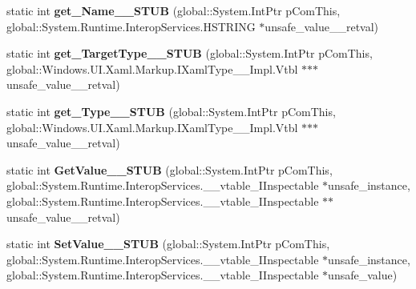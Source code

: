 \begin{DoxyCompactItemize}
\item 
\mbox{\label{struct_windows_1_1_u_i_1_1_xaml_1_1_markup_1_1_i_xaml_member_____impl_1_1_vtbl_a62fa2b1c4795a9faf836bcb5d053a965}} 
static int {\bfseries get\+\_\+\+Name\+\_\+\+\_\+\+S\+T\+UB} (global\+::\+System.\+Int\+Ptr p\+Com\+This, global\+::\+System.\+Runtime.\+Interop\+Services.\+H\+S\+T\+R\+I\+NG $\ast$unsafe\+\_\+value\+\_\+\+\_\+retval)
\item 
\mbox{\label{struct_windows_1_1_u_i_1_1_xaml_1_1_markup_1_1_i_xaml_member_____impl_1_1_vtbl_a5ca08627ab112151af93f8045a7e4d7f}} 
static int {\bfseries get\+\_\+\+Target\+Type\+\_\+\+\_\+\+S\+T\+UB} (global\+::\+System.\+Int\+Ptr p\+Com\+This, global\+::\+Windows.\+U\+I.\+Xaml.\+Markup.\+I\+Xaml\+Type\+\_\+\+\_\+\+Impl.\+Vtbl $\ast$$\ast$$\ast$unsafe\+\_\+value\+\_\+\+\_\+retval)
\item 
\mbox{\label{struct_windows_1_1_u_i_1_1_xaml_1_1_markup_1_1_i_xaml_member_____impl_1_1_vtbl_a1fe6ad1a5825b6a9bc1e12661eb240ac}} 
static int {\bfseries get\+\_\+\+Type\+\_\+\+\_\+\+S\+T\+UB} (global\+::\+System.\+Int\+Ptr p\+Com\+This, global\+::\+Windows.\+U\+I.\+Xaml.\+Markup.\+I\+Xaml\+Type\+\_\+\+\_\+\+Impl.\+Vtbl $\ast$$\ast$$\ast$unsafe\+\_\+value\+\_\+\+\_\+retval)
\item 
\mbox{\label{struct_windows_1_1_u_i_1_1_xaml_1_1_markup_1_1_i_xaml_member_____impl_1_1_vtbl_a701180ec993bf799ab85b05b4ac244e6}} 
static int {\bfseries Get\+Value\+\_\+\+\_\+\+S\+T\+UB} (global\+::\+System.\+Int\+Ptr p\+Com\+This, global\+::\+System.\+Runtime.\+Interop\+Services.\+\_\+\+\_\+vtable\+\_\+\+I\+Inspectable $\ast$unsafe\+\_\+instance, global\+::\+System.\+Runtime.\+Interop\+Services.\+\_\+\+\_\+vtable\+\_\+\+I\+Inspectable $\ast$$\ast$unsafe\+\_\+value\+\_\+\+\_\+retval)
\item 
\mbox{\label{struct_windows_1_1_u_i_1_1_xaml_1_1_markup_1_1_i_xaml_member_____impl_1_1_vtbl_ae54da9e1a9116b5083fcb8bf8405818f}} 
static int {\bfseries Set\+Value\+\_\+\+\_\+\+S\+T\+UB} (global\+::\+System.\+Int\+Ptr p\+Com\+This, global\+::\+System.\+Runtime.\+Interop\+Services.\+\_\+\+\_\+vtable\+\_\+\+I\+Inspectable $\ast$unsafe\+\_\+instance, global\+::\+System.\+Runtime.\+Interop\+Services.\+\_\+\+\_\+vtable\+\_\+\+I\+Inspectable $\ast$unsafe\+\_\+value)
$$
\end{DoxyCompactItemize}

